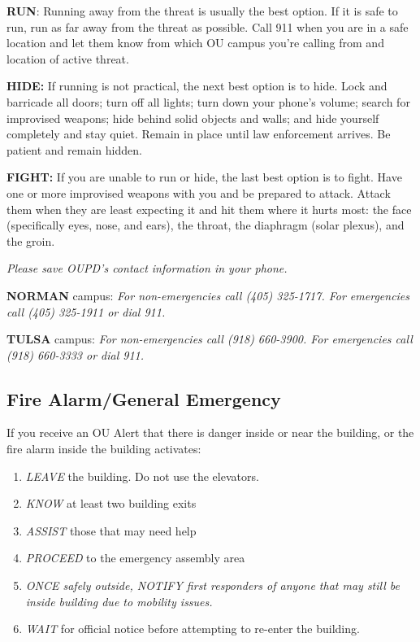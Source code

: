 \documentclass[11pt,english]{article}
\begin{document}
\textbf{RUN}: Running away from the threat is usually the best option. If it is safe to run, run as far away from the threat as possible. Call 911 when you are in a safe location and let them know from which OU campus you're calling from and location of active threat.

\textbf{HIDE:} If running is not practical, the next best option is to hide. Lock and barricade all doors; turn off all lights; turn down your phone's volume; search for improvised weapons; hide behind solid objects and walls; and hide yourself completely and stay quiet. Remain in place until law enforcement arrives. Be patient and remain hidden.

\textbf{FIGHT:} If you are unable to run or hide, the last best option is to fight. Have one or more improvised weapons with you and be prepared to attack. Attack them when they are least expecting it and hit them where it hurts most: the face (specifically eyes, nose, and ears), the throat, the diaphragm (solar plexus), and the groin.

\textit{Please save OUPD's contact information in your phone.}

\textbf{NORMAN} campus: \textit{For non-emergencies call (405) 325-1717. For emergencies call (405) 325-1911 or dial 911.}

\textbf{TULSA} campus: \textit{For non-emergencies call (918) 660-3900. For emergencies call (918) 660-3333 or dial 911.}

\subsection*{Fire Alarm/General Emergency}

If you receive an OU Alert that there is danger inside or near the building, or the fire alarm inside the building activates:

\begin{enumerate}
    \item \textit{LEAVE} the building. Do not use the elevators.
    \item \textit{KNOW} at least two building exits
    \item \textit{ASSIST} those that may need help
    \item \textit{PROCEED} to the emergency assembly area
    \item \textit{ONCE safely outside, NOTIFY first responders of anyone that may still be inside building due to mobility issues.}
    \item \textit{WAIT} for official notice before attempting to re-enter the building.
\end{enumerate}
\end{document}
